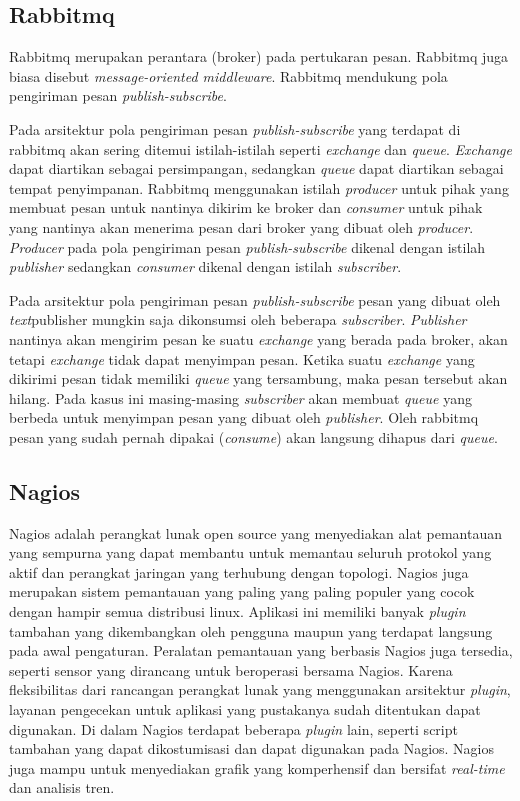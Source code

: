 \subsection{Rabbitmq}
Rabbitmq merupakan perantara (broker) pada pertukaran pesan. Rabbitmq juga biasa disebut \textit{message-oriented middleware}. Rabbitmq mendukung pola pengiriman pesan \textit{publish-subscribe}.

Pada arsitektur pola pengiriman pesan \textit{publish-subscribe} yang terdapat di rabbitmq akan sering ditemui istilah-istilah seperti \textit{exchange} dan \textit{queue}. \textit{Exchange} dapat diartikan sebagai persimpangan, sedangkan \textit{queue} dapat diartikan sebagai tempat penyimpanan. Rabbitmq menggunakan istilah \textit{producer} untuk pihak yang membuat pesan untuk nantinya dikirim ke broker dan \textit{consumer} untuk pihak yang nantinya akan menerima pesan dari broker yang dibuat oleh \textit{producer}. \textit{Producer} pada pola pengiriman pesan \textit{publish-subscribe} dikenal dengan istilah \textit{publisher} sedangkan \textit{consumer} dikenal dengan istilah \textit{subscriber}.

Pada arsitektur pola pengiriman pesan \textit{publish-subscribe} pesan yang dibuat oleh \textit{text}publisher mungkin saja dikonsumsi oleh beberapa \textit{subscriber}. \textit{Publisher} nantinya akan mengirim pesan ke suatu \textit{exchange} yang berada pada broker, akan tetapi \textit{exchange} tidak dapat menyimpan pesan. Ketika suatu \textit{exchange} yang dikirimi pesan tidak memiliki \textit{queue} yang tersambung, maka pesan tersebut akan hilang. Pada kasus ini masing-masing \textit{subscriber} akan membuat \textit{queue} yang berbeda untuk menyimpan pesan yang dibuat oleh \textit{publisher}. Oleh rabbitmq pesan yang sudah pernah dipakai (\textit{consume}) akan langsung dihapus dari \textit{queue}.

\subsection{Nagios}
Nagios adalah perangkat lunak open source yang menyediakan alat pemantauan yang sempurna yang dapat membantu untuk memantau seluruh protokol yang aktif dan perangkat jaringan yang terhubung dengan topologi. Nagios juga merupakan sistem pemantauan yang paling yang paling populer yang cocok dengan hampir semua distribusi linux. Aplikasi ini memiliki banyak \textit{plugin} tambahan yang dikembangkan oleh pengguna maupun yang terdapat langsung pada awal pengaturan. Peralatan pemantauan yang berbasis Nagios juga tersedia, seperti sensor yang dirancang untuk beroperasi bersama Nagios. Karena fleksibilitas dari rancangan perangkat lunak yang menggunakan arsitektur \textit{plugin}, layanan pengecekan untuk aplikasi yang pustakanya sudah ditentukan dapat digunakan. Di dalam Nagios terdapat beberapa \textit{plugin} lain, seperti script tambahan yang dapat dikostumisasi dan dapat digunakan pada Nagios. Nagios juga mampu untuk menyediakan grafik yang komperhensif dan bersifat \textit{real-time} dan analisis tren.


